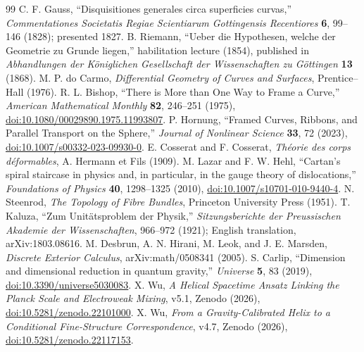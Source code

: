 \documentclass[11pt]{article}
\begin{document}
\clearpage
\balance
\begingroup
\footnotesize\raggedright
\setlength{\parskip}{0pt}
\begin{thebibliography}{99}
 C. F. Gauss, ``Disquisitiones generales circa superficies curvas,'' \emph{Commentationes Societatis Regiae Scientiarum Gottingensis Recentiores} \textbf{6}, 99--146 (1828); presented 1827.
 B. Riemann, ``Ueber die Hypothesen, welche der Geometrie zu Grunde liegen,'' habilitation lecture (1854), published in \emph{Abhandlungen der K\"oniglichen Gesellschaft der Wissenschaften zu G\"ottingen} \textbf{13} (1868).
 M. P. do Carmo, \emph{Differential Geometry of Curves and Surfaces}, Prentice--Hall (1976).
 R. L. Bishop, ``There is More than One Way to Frame a Curve,'' \emph{American Mathematical Monthly} \textbf{82}, 246--251 (1975), \href{https://doi.org/10.1080/00029890.1975.11993807}{doi:10.1080/00029890.1975.11993807}.
 P. Hornung, ``Framed Curves, Ribbons, and Parallel Transport on the Sphere,'' \emph{Journal of Nonlinear Science} \textbf{33}, 72 (2023), \href{https://doi.org/10.1007/s00332-023-09930-0}{doi:10.1007/s00332-023-09930-0}.
 E. Cosserat and F. Cosserat, \emph{Th\'eorie des corps d\'eformables}, A. Hermann et Fils (1909).
 M. Lazar and F. W. Hehl, ``Cartan's spiral staircase in physics and, in particular, in the gauge theory of dislocations,'' \emph{Foundations of Physics} \textbf{40}, 1298--1325 (2010), \href{https://doi.org/10.1007/s10701-010-9440-4}{doi:10.1007/s10701-010-9440-4}.
 N. Steenrod, \emph{The Topology of Fibre Bundles}, Princeton University Press (1951).
 T. Kaluza, ``Zum Unit\"atsproblem der Physik,'' \emph{Sitzungsberichte der Preussischen Akademie der Wissenschaften}, 966--972 (1921); English translation, arXiv:1803.08616.
 M. Desbrun, A. N. Hirani, M. Leok, and J. E. Marsden, \emph{Discrete Exterior Calculus}, arXiv:math/0508341 (2005).
 S. Carlip, ``Dimension and dimensional reduction in quantum gravity,'' \emph{Universe} \textbf{5}, 83 (2019), \href{https://doi.org/10.3390/universe5030083}{doi:10.3390/universe5030083}.
 X. Wu, \emph{A Helical Spacetime Ansatz Linking the Planck Scale and Electroweak Mixing}, v5.1, Zenodo (2026), \href{https://doi.org/10.5281/zenodo.22101000}{doi:10.5281/zenodo.22101000}.
 X. Wu, \emph{From a Gravity-Calibrated Helix to a Conditional Fine-Structure Correspondence}, v4.7, Zenodo (2026), \href{https://doi.org/10.5281/zenodo.22117153}{doi:10.5281/zenodo.22117153}.

\end{thebibliography}
\end{document}
